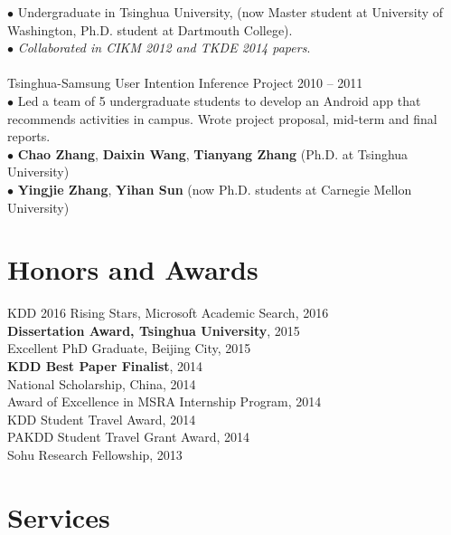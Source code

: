 \documentclass[margin, 10pt]{res}
\begin{document}
\begin{resume}
$\bullet$ Undergraduate in Tsinghua University, (now Master student at University of Washington, Ph.D. student at Dartmouth College). \\
$\bullet$ \textit{Collaborated in CIKM 2012 and TKDE 2014 papers}. \\ \\
Tsinghua-Samsung User Intention Inference Project \hfill{2010 -- 2011} \\
$\bullet$ Led a team of 5 undergraduate students to develop an Android app that recommends activities in campus. Wrote project proposal, mid-term and final reports. \\
$\bullet$ \textbf{Chao Zhang}, \textbf{Daixin Wang}, \textbf{Tianyang Zhang} (Ph.D. at Tsinghua University) \\
$\bullet$ \textbf{Yingjie Zhang}, \textbf{Yihan Sun} (now Ph.D. students at Carnegie Mellon University)


\section{Honors and Awards}

KDD 2016 Rising Stars, Microsoft Academic Search, 2016 \\
\textbf{Dissertation Award, Tsinghua University}, 2015 \\
{Excellent PhD Graduate, Beijing City}, 2015 \\
\textbf{KDD Best Paper Finalist}, 2014 \\
{National Scholarship, China}, 2014 \\
{Award of Excellence in MSRA Internship Program}, 2014 \\
{KDD Student Travel Award}, 2014 \\
{PAKDD Student Travel Grant Award}, 2014 \\
{Sohu Research Fellowship}, 2013


\section{Services}


\end{resume}
\end{document}

